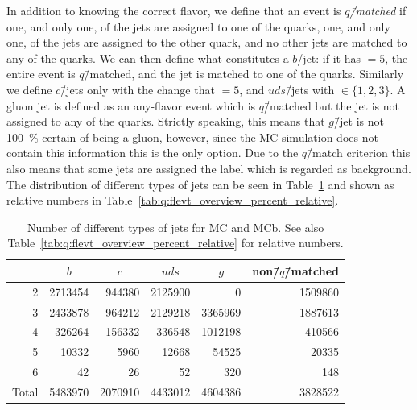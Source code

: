 In addition to knowing the correct flavor, we define that an event is \emph{$q$\=/matched} if one, and only one, of the jets are assigned to one of the quarks, one, and only one, of the jets are assigned to the other quark, and no other jets are matched to any of the quarks. We can then define what constitutes a $b$\=/jet: if it has  $= 5$, the entire event is $q$\=/matched, and the jet is matched to one of the quarks. Similarly we define $c$\=/jets only with the change that  $= 5$, and $uds$\=/jets with  $\in \{1, 2, 3\}$. A gluon jet is defined as an any-flavor event which is $q$\=/matched but the jet is not assigned to any of the quarks. Strictly speaking, this means that $g$\=/jet is not \SI{100}{\percent} certain of being a gluon, however, since the MC simulation does not contain this information this is the only option. Due to the $q$\=/match criterion this also means that some jets are assigned the label  which is regarded as background. The distribution of different types of jets can be seen in Table~\ref{tab:q:flevt_overview} and shown as relative numbers in Table~\ref{tab:q:flevt_overview_percent_relative}.

\begin{table}[h!]
  \centering
  \begin{tabular}{@{}rrrrrr@{}}
    {}    & \multicolumn{1}{c}{$b$} & \multicolumn{1}{c}{$c$} & \multicolumn{1}{c}{$uds$} & \multicolumn{1}{c}{$g$} & non\=/$q$\=/matched    \\ 
    \midrule
    2     & \num{2713454} &  \num{944380} & \num{2125900} &       \num{0} & \num{1509860} \\
    3     & \num{2433878} &  \num{964212} & \num{2129218} & \num{3365969} & \num{1887613} \\
    4     &  \num{326264} &  \num{156332} &  \num{336548} & \num{1012198} &  \num{410566} \\
    5     &   \num{10332} &    \num{5960} &   \num{12668} &   \num{54525} &   \num{20335} \\
    6     &      \num{42} &      \num{26} &      \num{52} &     \num{320} &     \num{148} \\
    \midrule
    Total & \num{5483970} & \num{2070910} & \num{4433012} & \num{4604386} & \num{3828522} \\
  \end{tabular}
  \caption{Number of different types of jets for MC and MCb. See also Table~\ref{tab:q:flevt_overview_percent_relative} for relative numbers.}
  \label{tab:q:flevt_overview}
\end{table}

